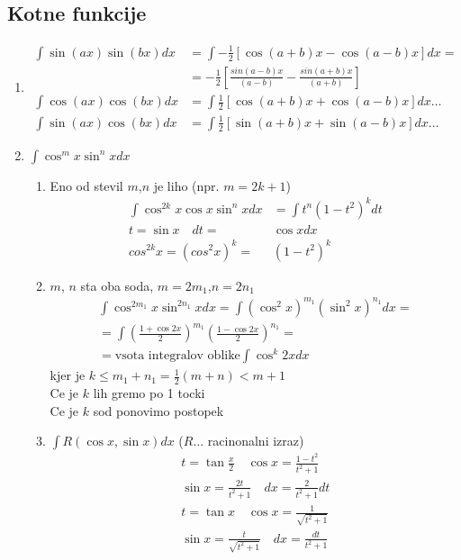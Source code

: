 \documentclass[a4paper,oneside,8pt]{extarticle}
\theoremstyle{definition}
\newcommand\ogl[1]{\left[#1\right]}
\newcommand\okr[1]{\left(#1\right)}
\begin{document}
\begin{multicols}{2}
	\subsection*{Kotne funkcije}
	\begin{enumerate}
		\item 
		\begin{align*}
			\int \sin{(ax)}\sin{(bx)} dx &= \int -\frac{1}{2}\ogl{\cos{(a+b)x} - \cos{(a-b)x}}dx =\\ 
			&=-\frac{1}{2}\ogl{\frac{sin{(a-b)x}}{(a-b)} - \frac{sin{(a+b)x}}{(a+b)}}\\
			\int \cos{(ax)}\cos{(bx)} dx &= \int \frac{1}{2}\ogl{\cos{(a+b)x} + \cos{(a-b)x}}dx \dots\\
			\int \sin{(ax)}\cos{(bx)} dx &= \int \frac{1}{2}\ogl{\sin{(a+b)x} + \sin{(a-b)x}}dx \dots
		\end{align*}
		\item $\int \cos^{m}{x}\sin^{n}{x}dx$
		\begin{enumerate}
			\item Eno od stevil $m$,$n$ je liho (npr. $m = 2k + 1$)\\
			\begin{align*}
				\int \cos^{2k}{x}\cos{x}\sin^{n}{x}dx &= \int t^n (1-t^2)^k dt\\
				t = \sin{x} \quad dt =& \cos{x}dx\\
				cos^{2k}{x} = (cos^{2}{x})^k =& (1-t^2)^k
			\end{align*}
			\item $m$, $n$ sta oba soda, $m = 2m_1$,$n = 2n_1$\\
			\begin{align*}
				\int \cos^{2m_1}{x}\sin^{2n_1}{x}dx = \int (\cos^{2}{x})^{m_1}(\sin^{2}{x})^{n_1}dx=\\
				=\int \okr{\frac{1+\cos{2x}}{2}}^{m_1}\okr{\frac{1-\cos{2x}}{2}}^{n_1} =\\
				=\text{vsota integralov oblike} \int \cos^k{2x}dx
			\end{align*}
			kjer je $k \leq m_1 + n_1 = \frac{1}{2}(m+n) < m + 1$\\
			Ce je $k$ lih gremo po 1 tocki\\
			Ce je $k$ sod ponovimo postopek\\
			\item $\int R(\cos{x}, \sin{x})dx$ ($R \dots$ racinonalni izraz)\\
			\begin{align*}
				t  = \tan{\frac{x}{2}} \quad \cos{x} = \frac{1 - t^2}{t^2 + 1}\\
				\sin{x} = \frac{2t}{t^2 + 1} \quad dx = \frac{2}{t^2 + 1}dt\\
				t  = \tan{x} \quad \cos{x} = \frac{1}{\sqrt{t^2 + 1}}\\
				\sin{x} = \frac{t}{\sqrt{t^2 + 1}} \quad dx = \frac{dt}{t^2 + 1}\\
			\end{align*}
		\end{enumerate}					
	\end{enumerate}	
%

\end{multicols}
\end{document}
